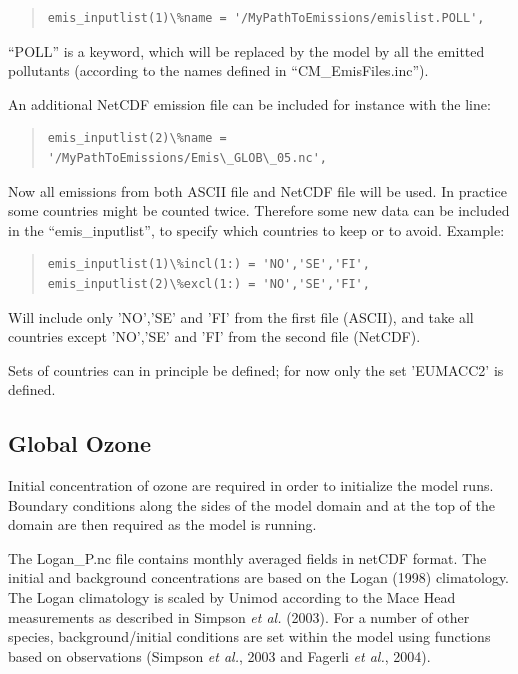 \documentclass[a4paper,12pt]{report}
\begin{document}
\begin{quote} \begin{verbatim}
emis_inputlist(1)\%name = '/MyPathToEmissions/emislist.POLL',
\end{verbatim} \end{quote} 

``POLL'' is a keyword, which will be replaced by the model by all the emitted pollutants (according to the 
names defined in ``CM\_EmisFiles.inc'').

An additional NetCDF emission file can be included for instance with the line:
\begin{quote} \begin{verbatim}
emis_inputlist(2)\%name = '/MyPathToEmissions/Emis\_GLOB\_05.nc',
\end{verbatim} \end{quote} 

Now all emissions from both ASCII file and NetCDF file will be used. In practice some countries might be counted twice. Therefore some new data can be included in the ``emis\_inputlist'', to specify which countries to keep or to avoid. Example:

\begin{quote} \begin{verbatim}
emis_inputlist(1)\%incl(1:) = 'NO','SE','FI',
emis_inputlist(2)\%excl(1:) = 'NO','SE','FI',
\end{verbatim} \end{quote} 

Will include only 'NO','SE' and 'FI' from the first file (ASCII), and take all countries except 'NO','SE' and 'FI' from the second file (NetCDF).

Sets of countries can in principle be defined; for now only the set 'EUMACC2' is defined.

\subsection{Global Ozone}
Initial concentration of ozone are required in order to
initialize the model runs. Boundary conditions along the sides of the model
domain and at the top of the domain are then required as the model is
running.

The Logan\_P.nc file contains monthly averaged fields in netCDF format. 
The initial and background
concentrations are based on the Logan (1998) climatology. The Logan
climatology is scaled by Unimod according to the Mace Head measurements as
described in Simpson {\sl et al.} (2003). For a number of other species, 
background/initial conditions are set within the model using functions 
based on observations (Simpson {\sl et al.}, 2003 and Fagerli {\sl et al.}, 2004).
\end{document}
